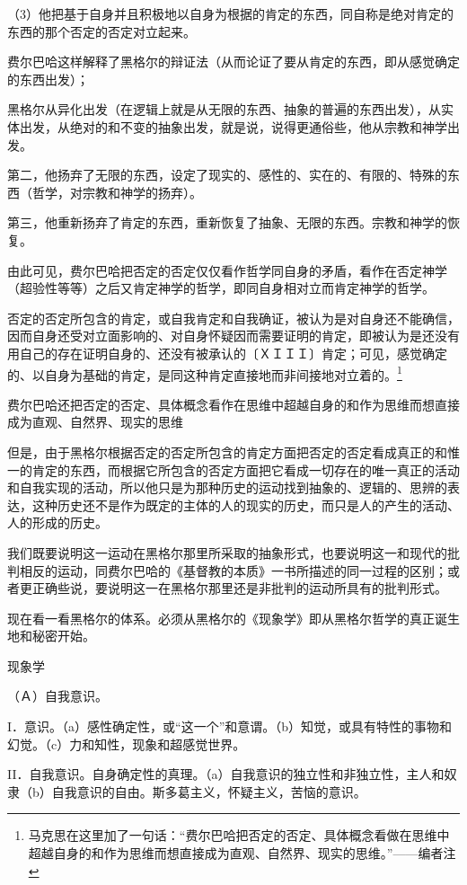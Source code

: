 \documentclass[a4paper,twoside,12pt]{ctexart}
\begin{document}
（3）他把基于自身并且积极地以自身为根据的肯定的东西，同自称是绝对肯定的东西的那个否定的否定对立起来。

费尔巴哈这样解释了黑格尔的辩证法（从而论证了要从肯定的东西，即从感觉确定的东西出发）；

黑格尔从异化出发（在逻辑上就是从无限的东西、抽象的普遍的东西出发），从实体出发，从绝对的和不变的抽象出发，就是说，说得更通俗些，他从宗教和神学出发。

第二，他扬弃了无限的东西，设定了现实的、感性的、实在的、有限的、特殊的东西（哲学，对宗教和神学的扬弃）。

第三，他重新扬弃了肯定的东西，重新恢复了抽象、无限的东西。宗教和神学的恢复。

由此可见，费尔巴哈把否定的否定仅仅看作哲学同自身的矛盾，看作在否定神学（超验性等等）之后又肯定神学的哲学，即同自身相对立而肯定神学的哲学。

否定的否定所包含的肯定，或自我肯定和自我确证，被认为是对自身还不能确信，因而自身还受对立面影响的、对自身怀疑因而需要证明的肯定，即被认为是还没有用自己的存在证明自身的、还没有被承认的〔ＸＩＩＩ〕肯定；可见，感觉确定的、以自身为基础的肯定，是同这种肯定直接地而非间接地对立着的。\footnote{马克思在这里加了一句话：“费尔巴哈把否定的否定、具体概念看做在思维中超越自身的和作为思维而想直接成为直观、自然界、现实的思维。”——编者注}

费尔巴哈还把否定的否定、具体概念看作在思维中超越自身的和作为思维而想直接成为直观、自然界、现实的思维

但是，由于黑格尔根据否定的否定所包含的肯定方面把否定的否定看成真正的和惟一的肯定的东西，而根据它所包含的否定方面把它看成一切存在的唯一真正的活动和自我实现的活动，所以他只是为那种历史的运动找到抽象的、逻辑的、思辨的表达，这种历史还不是作为既定的主体的人的现实的历史，而只是人的产生的活动、人的形成的历史。

我们既要说明这一运动在黑格尔那里所采取的抽象形式，也要说明这一和现代的批判相反的运动，同费尔巴哈的《基督教的本质》一书所描述的同一过程的区别；或者更正确些说，要说明这一在黑格尔那里还是非批判的运动所具有的批判形式。

现在看一看黑格尔的体系。必须从黑格尔的《现象学》即从黑格尔哲学的真正诞生地和秘密开始。

现象学

（Ａ）自我意识。

I．意识。（a）感性确定性，或“这一个”和意谓。（b）知觉，或具有特性的事物和幻觉。（c）力和知性，现象和超感觉世界。

II．自我意识。自身确定性的真理。（a）自我意识的独立性和非独立性，主人和奴隶（b）自我意识的自由。斯多葛主义，怀疑主义，苦恼的意识。
\end{document}
